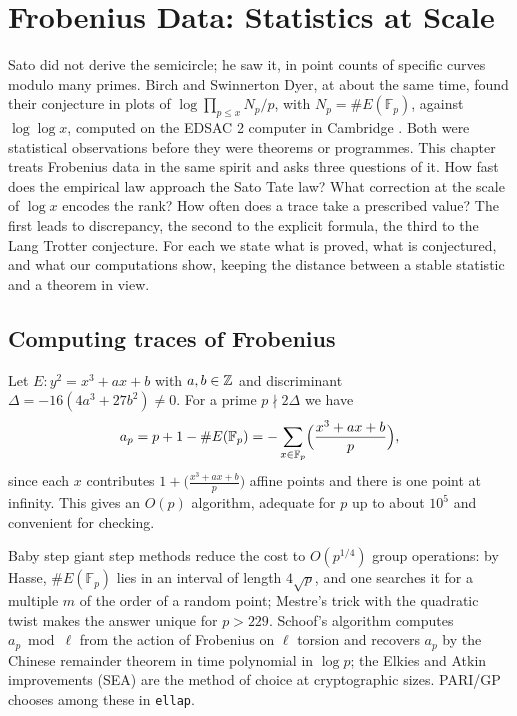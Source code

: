 \chapter{Frobenius Data: Statistics at Scale}\label{ch:05}

Sato did not derive the semicircle; he saw it, in point counts of specific curves modulo many primes. Birch and Swinnerton Dyer, at about the same time, found their conjecture in plots of $\log\prod_{p\le x}N_p/p$, with $N_p = \#E(\mathbb{F}_p)$, against $\log\log x$, computed on the EDSAC 2 computer in Cambridge \cite{bsd1965}. Both were statistical observations before they were theorems or programmes. This chapter treats Frobenius data in the same spirit and asks three questions of it. How fast does the empirical law approach the Sato Tate law? What correction at the scale of $\log x$ encodes the rank? How often does a trace take a prescribed value? The first leads to discrepancy, the second to the explicit formula, the third to the Lang Trotter conjecture. For each we state what is proved, what is conjectured, and what our computations show, keeping the distance between a stable statistic and a theorem in view.

\section{Computing traces of Frobenius}

Let $E: y^2 = x^3 + ax + b$ with $a,b\in\mathbb{Z}$ and discriminant $\Delta = -16(4a^3+27b^2) \ne 0$. For a prime $p \nmid 2\Delta$ we have
\[
a_p = p + 1 - \#E(\mathbb{F}_p) = -\sum_{x\in\mathbb{F}_p}\Bigl(\frac{x^3+ax+b}{p}\Bigr),
\]
since each $x$ contributes $1 + \bigl(\frac{x^3+ax+b}{p}\bigr)$ affine points and there is one point at infinity. This gives an $O(p)$ algorithm, adequate for $p$ up to about $10^5$ and convenient for checking.

Baby step giant step methods reduce the cost to $O(p^{1/4})$ group operations: by Hasse, $\#E(\mathbb{F}_p)$ lies in an interval of length $4\sqrt p$, and one searches it for a multiple $m$ of the order of a random point; Mestre's trick with the quadratic twist makes the answer unique for $p > 229$. Schoof's algorithm \cite{schoof1985} computes $a_p \bmod \ell$ from the action of Frobenius on $\ell$ torsion and recovers $a_p$ by the Chinese remainder theorem in time polynomial in $\log p$; the Elkies and Atkin improvements (SEA) are the method of choice at cryptographic sizes. PARI/GP \cite{pari2023} chooses among these in \texttt{ellap}.

